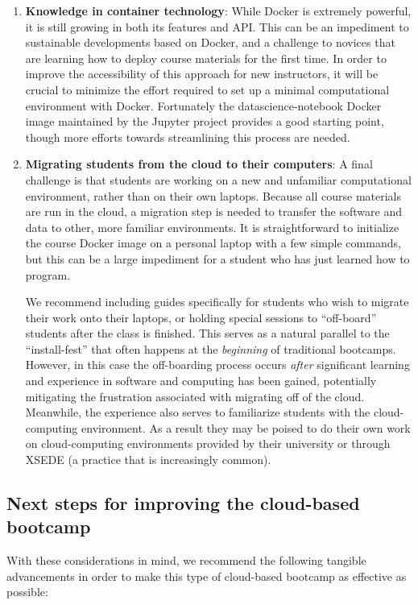 \begin{enumerate}
\item {\bf Knowledge in container technology}: While Docker is extremely powerful,
it is still growing in both its features and API. This can be an impediment to
sustainable developments based on Docker, and a challenge to novices that are
learning how to deploy course materials for the first time. In order to improve
the accessibility of this approach for new instructors, it will be crucial to
minimize the effort required to set up a minimal computational environment with
Docker. Fortunately the datascience-notebook Docker image maintained by the Jupyter
project provides a good starting point, though more efforts towards streamlining
this process are needed.

\item {\bf Migrating students from the cloud to their computers}: A final
challenge is that students are working on a new and
unfamiliar computational environment, rather than on their own laptops. Because
all course materials are run in the cloud, a migration step is
needed to transfer the software and data to other, more familiar environments.
It is straightforward to initialize the course Docker image on a
personal laptop with a
few simple commands, but this can be a large impediment for a student who has
just learned how to program.

We recommend including guides specifically for
students who wish to migrate their work onto their laptops, or holding special
sessions to ``off-board'' students after the class is finished. This serves as a
natural parallel to the ``install-fest'' that often happens at the
\emph{beginning} of traditional bootcamps. However, in this case the
off-boarding process occurs \emph{after} significant learning and experience in
software and computing has been gained, potentially mitigating the frustration
associated with migrating off of the cloud. Meanwhile, the experience also
serves to familiarize students with the cloud-computing environment. As a result
they may be poised to do their own work on cloud-computing environments
provided by their university or through XSEDE (a practice that is increasingly common).

\end{enumerate}

\subsection{Next steps for improving the cloud-based bootcamp}

With these considerations in mind, we recommend the following tangible
advancements in order to make this type of cloud-based bootcamp as effective
as possible:


